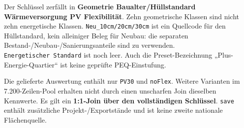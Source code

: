 \documentclass[
  ngerman,
  a4paper,
  DIV=11]{scrreprt}
\begin{document}
Der Schlüssel zerfällt in \textbf{Geometrie \textbar{}
Baualter/Hüllstandard \textbar{} Wärmeversorgung \textbar{} PV
\textbar{} Flexibilität}. Zehn geometrische Klassen sind nicht zehn
energetische Klassen. \texttt{Neu\_10cm/20cm/30cm} ist ein Quellcode für
den Hüllstandard, kein alleiniger Beleg für Neubau: die separaten
Bestand-/Neubau-/Sanierungsanteile sind zu verwenden.
\texttt{Energetischer\ Standard} ist noch leer. Auch die
Preset-Bezeichnung „Plus-Energie-Quartier`` ist keine geprüfte
PEQ-Einstufung.

Die gelieferte Auswertung enthält nur \texttt{PV30} und \texttt{noFlex}.
Weitere Varianten im 7.200-Zeilen-Pool erhalten nicht durch einen
unscharfen Join dieselben Kennwerte. Es gilt ein \textbf{1:1-Join über
den vollständigen Schlüssel}. \texttt{save} enthält zusätzliche
Projekt-/Exportstände und ist keine zweite nationale Flächenquelle.
\end{document}
